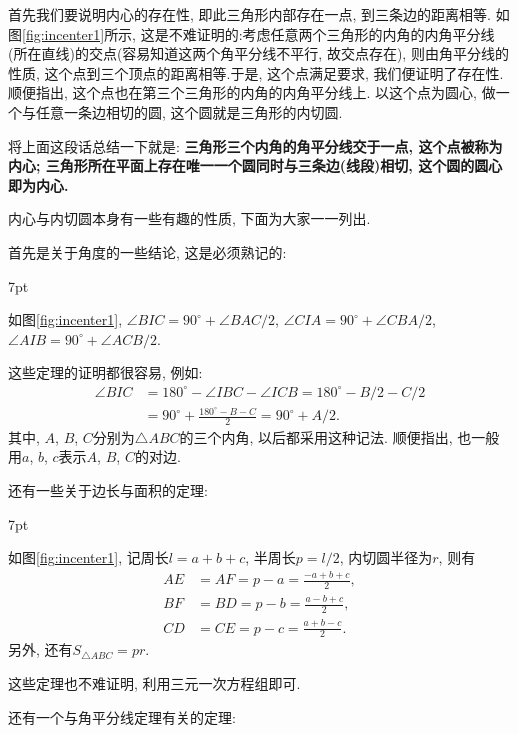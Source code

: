 \documentclass{book}
\newenvironment{theorem}{%
\def\FrameCommand{%
\hspace{1pt}%
{\color{cyan!60!blue}\vrule width 2pt}%
{\color{cyan!10}\vrule width 4pt}%
\colorbox{cyan!10}%
}%
\MakeFramed{\advance\hsize-\width\FrameRestore}%
\noindent\hspace{-4.55pt}%
\begin{adjustwidth}{}{7pt}%
\vspace{2pt}\vspace{2pt}%
}
{%
\vspace{2pt}\end{adjustwidth}\endMakeFramed%
}
\begin{document}
\begin{paracol}{2}
\switchcolumn
首先我们要说明内心的存在性, 即此三角形内部存在一点, 到三条边的距离相等. 如图\ref{fig:incenter1}所示, 这是不难证明的:考虑任意两个三角形的内角的内角平分线(所在直线)的交点(容易知道这两个角平分线不平行, 故交点存在), 则由角平分线的性质, 这个点到三个顶点的距离相等.于是, 这个点满足要求, 我们便证明了存在性. 顺便指出, 这个点也在第三个三角形的内角的内角平分线上. 以这个点为圆心, 做一个与任意一条边相切的圆, 这个圆就是三角形的内切圆.\par
将上面这段话总结一下就是: \textbf{三角形三个内角的角平分线交于一点, 这个点被称为内心; 三角形所在平面上存在唯一一个圆同时与三条边(线段)相切, 这个圆的圆心即为内心.}\par
内心与内切圆本身有一些有趣的性质, 下面为大家一一列出.\par
首先是关于角度的一些结论, 这是必须熟记的:
\begin{theorem}
	{\kaishu 如图\ref{fig:incenter1}, $\angle BIC=90^\circ+\angle BAC/2$, $\angle CIA=90^\circ+\angle CBA/2$, $\angle AIB=90^\circ+\angle ACB/2$.}
\end{theorem}\par
这些定理的证明都很容易, 例如:
\begin{align*}
	\angle BIC&=180^\circ-\angle IBC-\angle ICB=180^\circ-B/2-C/2\\
	&=90^\circ+\frac{180^\circ-B-C}{2}=90^\circ+A/2.
\end{align*}
其中, $A$, $B$, $C$分别为$\triangle ABC$的三个内角, 以后都采用这种记法. 顺便指出, 也一般用$a$, $b$, $c$表示$A$, $B$, $C$的对边.\par
还有一些关于边长与面积的定理:
\begin{theorem}
	{\kaishu 如图\ref{fig:incenter1}, 记周长$l=a+b+c$, 半周长$p=l/2$, 内切圆半径为$r$, 则有
	\begin{align*}
		AE&=AF=p-a=\frac{-a+b+c}{2},\\
		BF&=BD=p-b=\frac{a-b+c}{2},\\
		CD&=CE=p-c=\frac{a+b-c}{2}.
	\end{align*}
	另外, 还有$S_{\triangle ABC}=pr$.}
\end{theorem}\par
这些定理也不难证明, 利用三元一次方程组即可.\par
还有一个与角平分线定理有关的定理:\par


\end{paracol}
\end{document}
